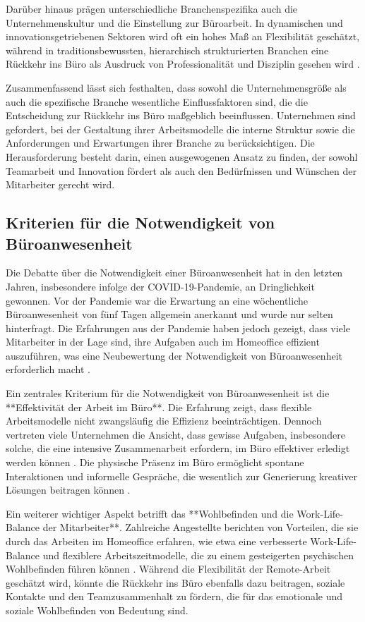 Darüber hinaus prägen unterschiedliche Branchenspezifika auch die Unternehmenskultur und die Einstellung zur Büroarbeit. In dynamischen und innovationsgetriebenen Sektoren wird oft ein hohes Maß an Flexibilität geschätzt, während in traditionsbewussten, hierarchisch strukturierten Branchen eine Rückkehr ins Büro als Ausdruck von Professionalität und Disziplin gesehen wird \cite{Autor, Jahr}.

Zusammenfassend lässt sich festhalten, dass sowohl die Unternehmensgröße als auch die spezifische Branche wesentliche Einflussfaktoren sind, die die Entscheidung zur Rückkehr ins Büro maßgeblich beeinflussen. Unternehmen sind gefordert, bei der Gestaltung ihrer Arbeitsmodelle die interne Struktur sowie die Anforderungen und Erwartungen ihrer Branche zu berücksichtigen. Die Herausforderung besteht darin, einen ausgewogenen Ansatz zu finden, der sowohl Teamarbeit und Innovation fördert als auch den Bedürfnissen und Wünschen der Mitarbeiter gerecht wird.

\subsection{Kriterien für die Notwendigkeit von Büroanwesenheit}

Die Debatte über die Notwendigkeit einer Büroanwesenheit hat in den letzten Jahren, insbesondere infolge der COVID-19-Pandemie, an Dringlichkeit gewonnen. Vor der Pandemie war die Erwartung an eine wöchentliche Büroanwesenheit von fünf Tagen allgemein anerkannt und wurde nur selten hinterfragt. Die Erfahrungen aus der Pandemie haben jedoch gezeigt, dass viele Mitarbeiter in der Lage sind, ihre Aufgaben auch im Homeoffice effizient auszuführen, was eine Neubewertung der Notwendigkeit von Büroanwesenheit erforderlich macht \cite{file1}.

Ein zentrales Kriterium für die Notwendigkeit von Büroanwesenheit ist die **Effektivität der Arbeit im Büro**. Die Erfahrung zeigt, dass flexible Arbeitsmodelle nicht zwangsläufig die Effizienz beeinträchtigen. Dennoch vertreten viele Unternehmen die Ansicht, dass gewisse Aufgaben, insbesondere solche, die eine intensive Zusammenarbeit erfordern, im Büro effektiver erledigt werden können \cite{file1}. Die physische Präsenz im Büro ermöglicht spontane Interaktionen und informelle Gespräche, die wesentlich zur Generierung kreativer Lösungen beitragen können \cite{file1}.

Ein weiterer wichtiger Aspekt betrifft das **Wohlbefinden und die Work-Life-Balance der Mitarbeiter**. Zahlreiche Angestellte berichten von Vorteilen, die sie durch das Arbeiten im Homeoffice erfahren, wie etwa eine verbesserte Work-Life-Balance und flexiblere Arbeitszeitmodelle, die zu einem gesteigerten psychischen Wohlbefinden führen können \cite{file1}. Während die Flexibilität der Remote-Arbeit geschätzt wird, könnte die Rückkehr ins Büro ebenfalls dazu beitragen, soziale Kontakte und den Teamzusammenhalt zu fördern, die für das emotionale und soziale Wohlbefinden von Bedeutung sind.

